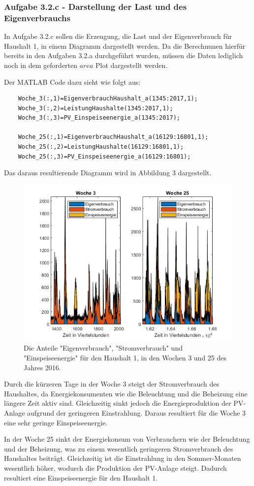 \documentclass[a4paper,12pt]{article}
\begin{document}
	\subsubsection{Aufgabe 3.2.c - Darstellung der Last und des Eigenverbrauchs}
	In Aufgabe 3.2.c sollen die Erzeugung, die Last und der Eigenverbrauch für Haushalt 1, in einem Diagramm dargestellt werden.\newline
	Da die Berechnunen hierfür bereits in den Aufgaben 3.2.a durchgeführt wurden, müssen die Daten lediglich noch in dem geforderten $area$ Plot dargestellt werden.\\ \par
	\noindent Der MATLAB Code dazu sieht wie folgt aus:
	\begin{lstlisting}
	Woche_3(:,1)=EigenverbrauchHaushalt_a(1345:2017,1);
	Woche_3(:,2)=LeistungHaushalte(1345:2017,1);
	Woche_3(:,3)=PV_Einspeiseenergie_a(1345:2017);
	
	Woche_25(:,1)=EigenverbrauchHaushalt_a(16129:16801,1);
	Woche_25(:,2)=LeistungHaushalte(16129:16801,1);
	Woche_25(:,3)=PV_Einspeiseenergie_a(16129:16801);
	\end{lstlisting}
	Das daraus resultierende Diagramm wird in Abbildung 3 dargestellt.
	\begin{figure}[H]
		\centering
		\includegraphics[width=12cm]{img/results/LastundEigenverbrauch}
		\caption{Die Anteile "Eigenverbrauch", "Stromverbrauch" und "Einspeiseenergie" für den Haushalt 1, in den Wochen 3 und 25 des Jahres 2016.}
	\end{figure}
	\noindent Durch die kürzeren Tage in der Woche 3 steigt der Stromverbrauch des Haushaltes, da Energiekonsumenten wie die Beleuchtung und die Beheizung eine längere Zeit aktiv sind. Gleichzeitig sinkt jedoch die Energieproduktion der PV-Anlage aufgrund der geringeren Einstrahlung. Daraus resultiert für die Woche 3 eine sehr geringe Einspeiseenergie.\\ \par
	\noindent In der Woche 25 sinkt der Energiekonsum von Verbrauchern wie der Beleuchtung und der Beheizung, was zu einem wesentlich geringeren Stromverbrauch des Haushaltes beiträgt. Gleichzeitig ist die Einstrahlung in den Sommer-Monaten wesentlich höher, wodurch die Produktion der PV-Anlage steigt. Dadurch resultiert eine Einspeiseenergie für den Haushalt 1.
\end{document}
